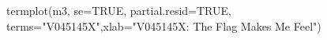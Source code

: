 \begin{Schunk}
\begin{Sinput}
 termplot(m3, se=TRUE, partial.resid=TRUE, terms="V045145X",xlab="V045145X: The Flag Makes Me Feel")
\end{Sinput}
\end{Schunk}
